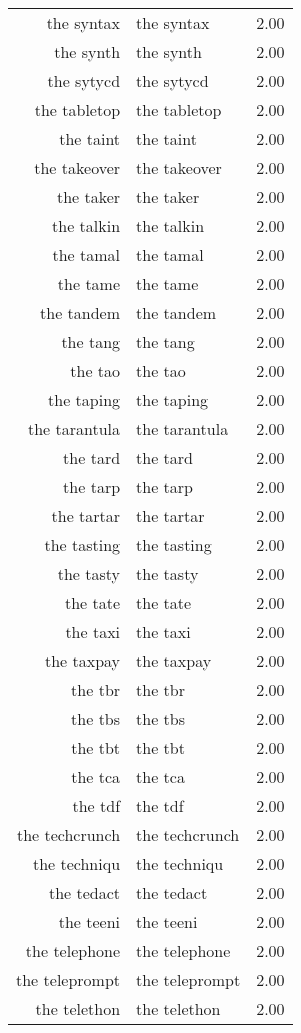 \begin{table}[ht]
\begin{tabular}{rlr}
  the syntax & the syntax & 2.00 \\ 
  the synth & the synth & 2.00 \\ 
  the sytycd & the sytycd & 2.00 \\ 
  the tabletop & the tabletop & 2.00 \\ 
  the taint & the taint & 2.00 \\ 
  the takeover & the takeover & 2.00 \\ 
  the taker & the taker & 2.00 \\ 
  the talkin & the talkin & 2.00 \\ 
  the tamal & the tamal & 2.00 \\ 
  the tame & the tame & 2.00 \\ 
  the tandem & the tandem & 2.00 \\ 
  the tang & the tang & 2.00 \\ 
  the tao & the tao & 2.00 \\ 
  the taping & the taping & 2.00 \\ 
  the tarantula & the tarantula & 2.00 \\ 
  the tard & the tard & 2.00 \\ 
  the tarp & the tarp & 2.00 \\ 
  the tartar & the tartar & 2.00 \\ 
  the tasting & the tasting & 2.00 \\ 
  the tasty & the tasty & 2.00 \\ 
  the tate & the tate & 2.00 \\ 
  the taxi & the taxi & 2.00 \\ 
  the taxpay & the taxpay & 2.00 \\ 
  the tbr & the tbr & 2.00 \\ 
  the tbs & the tbs & 2.00 \\ 
  the tbt & the tbt & 2.00 \\ 
  the tca & the tca & 2.00 \\ 
  the tdf & the tdf & 2.00 \\ 
  the techcrunch & the techcrunch & 2.00 \\ 
  the techniqu & the techniqu & 2.00 \\ 
  the tedact & the tedact & 2.00 \\ 
  the teeni & the teeni & 2.00 \\ 
  the telephone & the telephone & 2.00 \\ 
  the teleprompt & the teleprompt & 2.00 \\ 
  the telethon & the telethon & 2.00 \\ 

\end{tabular}
\end{table}
